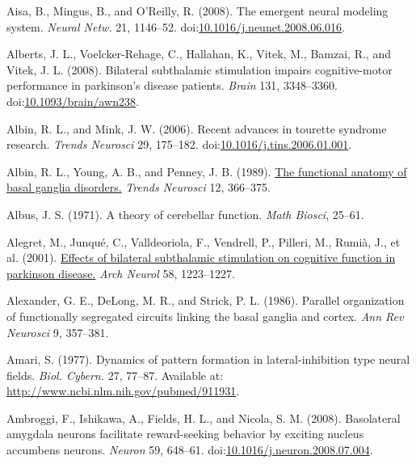 \documentclass[
  11pt,
  a4paper,
]{scrbook}
\newlength{\cslhangindent}
\newenvironment{CSLReferences}[2] %
 {\begin{list}{}{%
  \setlength{\itemindent}{0pt}
  \setlength{\leftmargin}{0pt}
  \setlength{\parsep}{0pt}
  \ifodd #1
   \setlength{\leftmargin}{\cslhangindent}
   \setlength{\itemindent}{-1\cslhangindent}
  \fi
  \setlength{\itemsep}{#2\baselineskip}}}
 {\end{list}}
\begin{document}
\label{refs}
\begin{CSLReferences}{1}{1}
Aisa, B., Mingus, B., and O'Reilly, R. (2008). {The emergent neural
modeling system.} \emph{Neural Netw.} 21, 1146--52.
doi:\href{https://doi.org/10.1016/j.neunet.2008.06.016}{10.1016/j.neunet.2008.06.016}.

Alberts, J. L., Voelcker-Rehage, C., Hallahan, K., Vitek, M., Bamzai,
R., and Vitek, J. L. (2008). Bilateral subthalamic stimulation impairs
cognitive-motor performance in parkinson's disease patients.
\emph{Brain} 131, 3348--3360.
doi:\href{https://doi.org/10.1093/brain/awn238}{10.1093/brain/awn238}.

Albin, R. L., and Mink, J. W. (2006). Recent advances in tourette
syndrome research. \emph{Trends Neurosci} 29, 175--182.
doi:\href{https://doi.org/10.1016/j.tins.2006.01.001}{10.1016/j.tins.2006.01.001}.

Albin, R. L., Young, A. B., and Penney, J. B. (1989).
\href{https://www.ncbi.nlm.nih.gov/pubmed/2479133}{The functional
anatomy of basal ganglia disorders.} \emph{Trends Neurosci} 12,
366--375.

Albus, J. S. (1971). A theory of cerebellar function. \emph{Math
Biosci}, 25--61.

Alegret, M., Junqué, C., Valldeoriola, F., Vendrell, P., Pilleri, M.,
Rumià, J., et al. (2001).
\href{https://www.ncbi.nlm.nih.gov/pubmed/11493162}{Effects of bilateral
subthalamic stimulation on cognitive function in parkinson disease.}
\emph{Arch Neurol} 58, 1223--1227.

Alexander, G. E., DeLong, M. R., and Strick, P. L. (1986). Parallel
organization of functionally segregated circuits linking the basal
ganglia and cortex. \emph{Ann Rev Neurosci} 9, 357--381.

Amari, S. (1977). {Dynamics of pattern formation in lateral-inhibition
type neural fields.} \emph{Biol. Cybern.} 27, 77--87. Available at:
\url{http://www.ncbi.nlm.nih.gov/pubmed/911931}.

Ambroggi, F., Ishikawa, A., Fields, H. L., and Nicola, S. M. (2008).
{Basolateral amygdala neurons facilitate reward-seeking behavior by
exciting nucleus accumbens neurons.} \emph{Neuron} 59, 648--61.
doi:\href{https://doi.org/10.1016/j.neuron.2008.07.004}{10.1016/j.neuron.2008.07.004}.


\end{CSLReferences}
\end{document}
